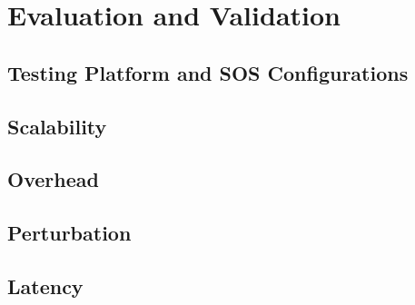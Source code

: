 
\section{Evaluation and Validation}


\subsection{Testing Platform and SOS Configurations}


\subsection{Scalability}


\subsection{Overhead}


\subsection{Perturbation}


\subsection{Latency}




